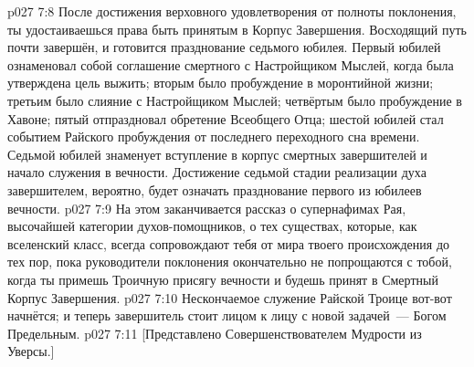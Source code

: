 \vs p027 7:8 \pc После достижения верховного удовлетворения от полноты поклонения, ты удостаиваешься права быть принятым в Корпус Завершения. Восходящий путь почти завершён, и готовится празднование седьмого юбилея. Первый юбилей ознаменовал собой соглашение смертного с Настройщиком Мыслей, когда была утверждена цель выжить; вторым было пробуждение в моронтийной жизни; третьим было слияние с Настройщиком Мыслей; четвёртым было пробуждение в Хавоне; пятый отпраздновал обретение Всеобщего Отца; шестой юбилей стал событием Райского пробуждения от последнего переходного сна времени. Седьмой юбилей знаменует вступление в корпус смертных завершителей и начало служения в вечности. Достижение седьмой стадии реализации духа завершителем, вероятно, будет означать празднование первого из юбилеев вечности.
\vs p027 7:9 \pc На этом заканчивается рассказ о супернафимах Рая, высочайшей категории духов\hyp{}помощников, о тех существах, которые, как вселенский класс, всегда сопровождают тебя от мира твоего происхождения до тех пор, пока руководители поклонения окончательно не попрощаются с тобой, когда ты примешь Троичную присягу вечности и будешь принят в Смертный Корпус Завершения.
\vs p027 7:10 Нескончаемое служение Райской Троице вот\hyp{}вот начнётся; и теперь завершитель стоит лицом к лицу с новой задачей~--- Богом Предельным.
\vsetoff
\vs p027 7:11 [Представлено Совершенствователем Мудрости из Уверсы.]
\quizlink
